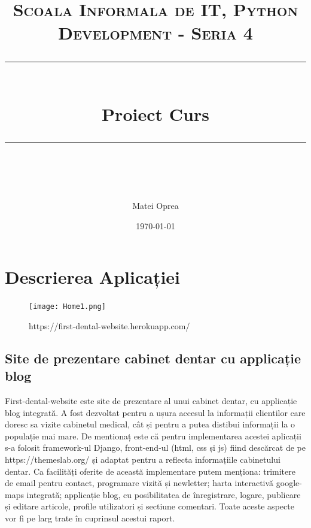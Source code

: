 \documentclass[11pt]{scrartcl} %
\title{	
	\normalfont\normalsize
	\textsc{Scoala Informala de IT, Python Development - Seria 4}\\ %
	\vspace{25pt} %
	\rule{\linewidth}{0.5pt}\\ %
	\vspace{20pt} %
	{\huge Proiect Curs}\\ %
	\vspace{12pt} %
	\rule{\linewidth}{2pt}\\ %
	\vspace{12pt} %
}
\author{\LARGE Matei Oprea} %
\date{\normalsize\today} %
\begin{document}
\maketitle %

\pagebreak

\tableofcontents

\pagebreak

\section{Descrierea Aplicației}

\begin{figure}[h] %
	\centering
	\texttt{[image: Home1.png]} %
	\caption{https://first-dental-website.herokuapp.com/}
	\label{fig:acasa}
\end{figure}



\subsection{Site de prezentare cabinet dentar cu applicație blog}

First-dental-website este site de prezentare al unui cabinet dentar, cu applicație blog integrată. A fost dezvoltat pentru a ușura accesul la informații clientilor care doresc sa vizite cabinetul medical, cât și pentru a putea distibui informații la o populație mai mare. De mentionaț este că pentru implementarea acestei aplicații s-a folosit framework-ul Django, front-end-ul (html, css și js) fiind descărcat de pe https://themeslab.org/ și adaptat pentru a reflecta informațiile cabinetului dentar. Ca facilități oferite de această implementare putem menționa: trimitere de email pentru contact, programare vizită și newletter; harta interactivă google-maps integrată; applicație blog, cu posibilitatea de înregistrare, logare, publicare și editare articole, profile utilizatori și sectiune comentari. Toate aceste aspecte vor fi pe larg trate în cuprinsul acestui raport. 


\pagebreak
\end{document}
